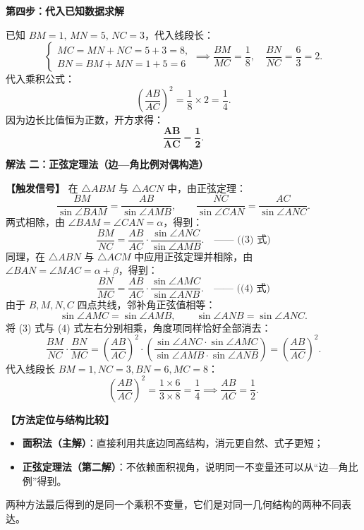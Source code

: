 \documentclass[11pt,a4paper,fontset=fandol]{ctexart}
\newcommand{\ans}[1]{\boxed{#1}}
\newcommand{\method}[1]{\par\medskip\noindent\textbf{解法 #1}\par}
\begin{document}
\textbf{第四步：代入已知数据求解}

已知 $BM = 1, \, MN = 5, \, NC = 3$，代入线段长：
\[
\begin{cases}
MC = MN + NC = 5 + 3 = 8,\\[0.3em]
BN = BM + MN = 1 + 5 = 6
\end{cases}
\implies \frac{BM}{MC} = \frac{1}{8}, \quad \frac{BN}{NC} = \frac{6}{3} = 2.
\]
代入乘积公式：
\[
\left(\frac{AB}{AC}\right)^2 = \frac{1}{8} \times 2 = \frac{1}{4}.
\]
因为边长比值恒为正数，开方求得：
\[
\mathbf{\frac{AB}{AC} = \ans{\frac{1}{2}}}.
\]

\method{二：正弦定理法（边—角比例对偶构造）}

\noindent\textbf{【触发信号】}
在 $\triangle ABM$ 与 $\triangle ACN$ 中，由正弦定理：
\[
\frac{BM}{\sin\angle BAM} = \frac{AB}{\sin\angle AMB}, \qquad \frac{NC}{\sin\angle CAN} = \frac{AC}{\sin\angle ANC}.
\]
两式相除，由 $\angle BAM = \angle CAN = \alpha$，得到：
\[
\frac{BM}{NC} = \frac{AB}{AC} \cdot \frac{\sin\angle ANC}{\sin\angle AMB}. \quad \text{—— ((3) 式)}
\]
同理，在 $\triangle ABN$ 与 $\triangle ACM$ 中应用正弦定理并相除，由 $\angle BAN = \angle MAC = \alpha + \beta$，得到：
\[
\frac{BN}{MC} = \frac{AB}{AC} \cdot \frac{\sin\angle AMC}{\sin\angle ANB}. \quad \text{—— ((4) 式)}
\]
由于 $B, M, N, C$ 四点共线，邻补角正弦值相等：
\[
\sin\angle AMC = \sin\angle AMB, \qquad \sin\angle ANB = \sin\angle ANC.
\]
将 (3) 式与 (4) 式左右分别相乘，角度项同样恰好全部消去：
\[
\frac{BM}{NC} \cdot \frac{BN}{MC} = \left(\frac{AB}{AC}\right)^2 \cdot \left( \frac{\sin\angle ANC \cdot \sin\angle AMC}{\sin\angle AMB \cdot \sin\angle ANB} \right) = \left(\frac{AB}{AC}\right)^2.
\]
代入线段长 $BM=1, NC=3, BN=6, MC=8$：
\[
\left(\frac{AB}{AC}\right)^2 = \frac{1 \times 6}{3 \times 8} = \frac{1}{4} \implies \frac{AB}{AC} = \ans{\frac{1}{2}}.
\]

\begin{note}
\textbf{【方法定位与结构比较】}
\begin{itemize}[leftmargin=1.5em]
  \item \textbf{面积法（主解）}：直接利用共底边同高结构，消元更自然、式子更短；
  \item \textbf{正弦定理法（第二解）}：不依赖面积视角，说明同一不变量还可以从“边—角比例”得到。
\end{itemize}
两种方法最后得到的是同一个乘积不变量，它们是对同一几何结构的两种不同表达。
\end{note}
\end{document}
